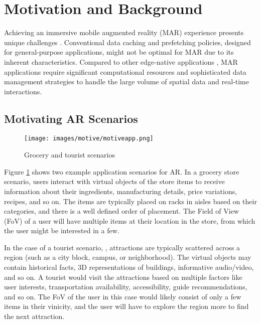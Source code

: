 \section{Motivation and Background}
\label{sec:motive}
    Achieving an immersive mobile augmented reality (MAR) experience presents unique challenges \cite{bib:networkar,bib:locar}. Conventional data caching and prefetching policies, designed for general-purpose applications, might not be optimal for MAR due to its inherent characteristics\cite{bib:archaract}. Compared to other edge-native applications \cite{bib:edgenative}, MAR applications require significant computational resources and sophisticated data management strategies to handle the large volume of spatial data and real-time interactions. 

    \subsection{Motivating AR Scenarios}
    \begin{figure}
        \centering
        \texttt{[image: images/motive/motiveapp.png]}
        \caption{Grocery and tourist scenarios}
        \label{fig:motiveapp}
        \vspace{-6mm}
    \end{figure}
    Figure \ref{fig:motiveapp} shows two example application scenarios for AR. In a grocery store scenario\cite{bib:phara}, users interact with virtual objects of the store items to receive information about their ingredients, manufacturing details, price variations, recipes, and so on. The items are typically placed on racks in aisles based on their categories, and there is a well defined order of placement. The Field of View (FoV) of a user will have multiple items at their location in the store, from which the user might be interested in a few. 
    
    In the case of a tourist scenario, \cite{bib:dublin}, attractions are typically scattered across a region (such as a city block, campus, or neighborhood). The virtual objects may contain historical facts, 3D representations of buildings, informative audio/video, and so on. A tourist would visit the attractions based on multiple factors like user interests, transportation availability, accessibility, guide recommendations, and so on. The FoV of the user in this case would likely consist of only a few items in their vinicity, and the user will have to explore the region more to find the next attraction. 

